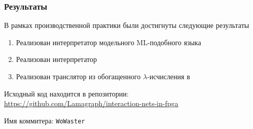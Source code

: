 \documentclass
  [ russian
  , aspectratio=169 %
  ] {beamer}
\begin{document}
\begin{frame}
    \frametitle{Результаты}
    В рамках производственной практики были достигнуты следующие результаты
    \begin{enumerate}
        \item Реализован интерпретатор модельного ML-подобного языка
        \item Реализован интерпретатор \INs{}
        \item Реализован транслятор из обогащенного $\lambda$-исчисления в \INs{}
    \end{enumerate}

    \vspace{1em}

    Исходный код находится в репозитории: \url{https://github.com/Lamagraph/interaction-nets-in-fpga}

    Имя коммитера: \texttt{WoWaster}
\end{frame}
\end{document}
